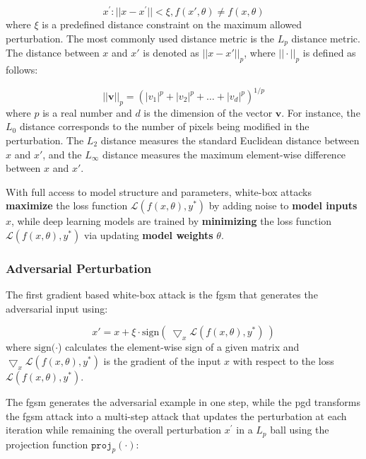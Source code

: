 \begin{equation}
x^{'}: ||x - x^{'}|| < \xi, f(x', \theta) \neq f(x, \theta)
\end{equation}
where $ \xi$ is a predefined distance constraint on the maximum allowed perturbation. The most commonly used distance metric is the $L_p$ distance metric. The distance between $x$ and $x'$ is denoted as $||x-x'||_{p}$, where $||\cdot||_p$ is defined as follows:

\begin{equation}
 ||\textbf{v}||_p = (|v_1|^p + |v_2|^p + \dots + |v_d|^p)^{1/p}
\end{equation}
where $p$ is a real number and $d$ is the dimension of the vector $\textbf{v}$. For instance, the $L_0$ distance corresponds to the number of pixels being modified in the perturbation. The $L_2$ distance measures the standard Euclidean distance between $x$ and $x'$, and the $L_\infty$ distance measures the maximum element-wise difference between $x$ and $x'$.

With full access to model structure and parameters, white-box attacks \textbf{maximize} the loss function  $\mathcal{L}(f(x, \theta), y^*)$ by adding noise to \textbf{ model inputs} $x$, while deep learning models are trained by \textbf{minimizing} the loss function  $\mathcal{L}(f(x, \theta), y^*)$ via updating \textbf{model weights} $\theta$.

\subsubsection{Adversarial Perturbation}

The first gradient based white-box attack is the \acrfull{fgsm} \citep{goodfellow2015explaining} that generates the adversarial input using:

\begin{equation}
x' = x + \xi \cdot \text{sign}(\ \bigtriangledown_x \mathcal{L}(f(x, \theta), y^*)\ )    
\end{equation} 
where $\text{sign}(\cdot$) calculates the element-wise sign of a given matrix and $\bigtriangledown_x \mathcal{L}(f(x, \theta), y^*)$ is the gradient of the input $x$ with respect to the loss $\mathcal{L}(f(x, \theta), y^*)$.

The \acrshort{fgsm} generates the adversarial example in one step, while the \acrfull{pgd} \citep{madry2017towards} transforms the \acrshort{fgsm} attack into a multi-step attack that updates the perturbation at each iteration while remaining the overall perturbation $x^{'}$ in a $L_p$ ball using the projection function $\texttt{proj}_{p}(\cdot)$:

